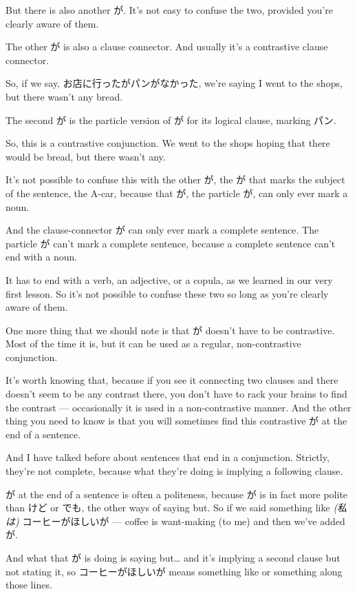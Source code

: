 But there is also another が. It's not easy to confuse the two, provided you're clearly aware of them.

The other が is also a clause connector. And usually it's a contrastive clause connector.

So, if we say, お店に行ったがパンがなかった, we're saying I went to the shops, but there wasn't any bread.

The second が is the particle version of が for its logical clause, marking パン.

So, this is a contrastive conjunction. We went to the shops hoping that there would be bread, but there wasn't any.

It's not possible to confuse this with the other が, the が that marks the subject of the sentence, the A-car, because that が, the particle が, can only ever mark a noun.

{}

And the clause-connector が can only ever mark a complete sentence. The particle が can't mark a complete sentence, because a complete sentence can't end with a noun.

It has to end with a verb, an adjective, or a copula, as we learned in our very first lesson. So it's not possible to confuse these two so long as you're clearly aware of them.

One more thing that we should note is that が doesn't have to be contrastive. Most of the time it is, but it can be used as a regular, non-contrastive conjunction.

It's worth knowing that, because if you see it connecting two clauses and there doesn't seem to be any contrast there, you don't have to rack your brains to find the contrast --- occasionally it is used in a non-contrastive manner. And the other thing you need to know is that you will sometimes find this contrastive が at the end of a sentence.

And I have talked before about sentences that end in a conjunction. Strictly, they're not complete, because what they're doing is implying a following clause.

が at the end of a sentence is often a politeness, because が is in fact more polite than けど or でも, the other ways of saying but. So if we said something like {\em (私は)} コーヒーがほしいが --- coffee is want-making (to me) and then we've added が.

{}

And what that が is doing is saying but\ldots{} and it's implying a second clause but not stating it, so コーヒーがほしいが means something like  or something along those lines.

